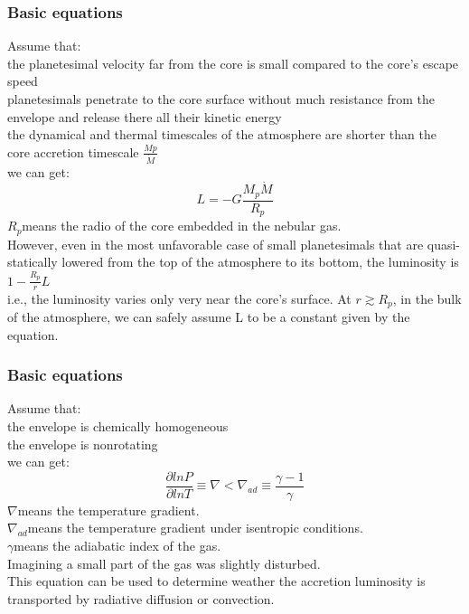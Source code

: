 \documentclass{beamer}
\begin{document}
\begin{frame}
\frametitle{Basic equations}
Assume that:\\
{\small the planetesimal velocity far from the core is small compared to the core’s escape speed\\
planetesimals penetrate to the core surface without much resistance from the envelope and release there all their kinetic energy\\
the dynamical and thermal timescales of the atmosphere are shorter than the core accretion timescale $\frac{Mp}{\dot{M}}$\\}
we can get:
\begin{equation}
L = -G\frac{M_p \dot{M}}{R_p}
\end{equation}
$R_p$means the radio of the core embedded in the nebular gas.\\
{\small However, even in the most unfavorable case of small planetesimals that are quasi-statically lowered from the top of the atmosphere to its bottom, 
the luminosity is $1 - \frac{R_p}{r}L$\\
i.e., the luminosity varies only very near the core’s surface. At $r \gtrsim R_p$, in the bulk of the atmosphere, we can safely assume L to be a constant given by the equation.}
\end{frame}

\begin{frame}
\frametitle{Basic equations}
Assume that:\\
the envelope is chemically homogeneous\\
the envelope is nonrotating\\
we can get:
\begin{equation}
\frac{\partial ln P}{\partial ln T} \equiv \nabla < \nabla_{ad} \equiv \frac{\gamma-1}{\gamma}
\end{equation}
$\nabla$means the temperature gradient.\\
$\nabla_{ad}$means the temperature gradient under isentropic conditions.\\
$\gamma$means the adiabatic index of the gas.\\
Imagining a small part of the gas was slightly disturbed.\\
This equation can be used to determine weather the accretion luminosity is transported by radiative diffusion or convection.
\end{frame}
\end{document}
